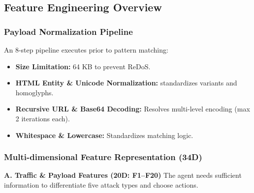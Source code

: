 \documentclass[12pt,a4paper]{report}
\begin{document}
\subsection{Feature Engineering Overview}

\subsubsection{Payload Normalization Pipeline}

An 8-step pipeline executes prior to pattern matching:
\begin{itemize}
    \item \textbf{Size Limitation:} 64 KB to prevent ReDoS.
    \item \textbf{HTML Entity \& Unicode Normalization:} standardizes variants and homoglyphs.
    \item \textbf{Recursive URL \& Base64 Decoding:} Resolves multi-level encoding (max 2 iterations each).
    \item \textbf{Whitespace \& Lowercase:} Standardizes matching logic.
\end{itemize}

\subsubsection{Multi-dimensional Feature Representation (34D)}

\textbf{A. Traffic \& Payload Features (20D: F1–F20)}
The agent needs sufficient information to differentiate five attack types and choose actions.

\begin{table}[htbp]
\centering
\caption{Inventory of Traffic and Payload Features}
\label{tab:f1_f20_inventory}

\setlength{\tabcolsep}{4pt} %


\end{table}
\end{document}
